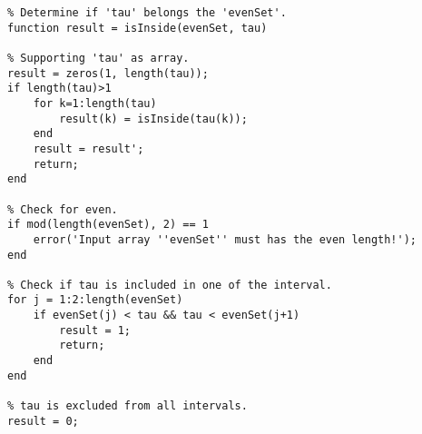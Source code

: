 \begin{verbatim}
% Determine if 'tau' belongs the 'evenSet'.
function result = isInside(evenSet, tau)

% Supporting 'tau' as array.
result = zeros(1, length(tau));
if length(tau)>1
	for k=1:length(tau)
		result(k) = isInside(tau(k));
	end
	result = result';
	return;
end

% Check for even.
if mod(length(evenSet), 2) == 1
	error('Input array ''evenSet'' must has the even length!');
end

% Check if tau is included in one of the interval.
for j = 1:2:length(evenSet)
	if evenSet(j) < tau && tau < evenSet(j+1)
		result = 1;
		return;
	end
end

% tau is excluded from all intervals.
result = 0;
\end{verbatim}
